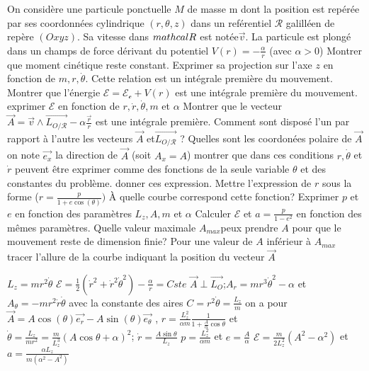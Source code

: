 \begin{Exercise}[title=(*) Vecteur de Runge-Lentz]
  On considère une particule ponctuelle $M$ de masse m dont la position est
  repérée par ses coordonnées cylindrique $(r,\theta,z)$ dans un reférentiel
  $\mathcal{R}$  galilléen de repère $(Oxyz)$. Sa vitesse dans $\\mathcal{R}$
  est notée$\vec{v}$. La particule est plongé dans un champs de force dérivant
  du potentiel $V(r)=-\frac{\alpha}{r}$ (avec $\alpha>0$)
  \Question Montrer que moment cinétique reste constant. Exprimer sa projection
  sur l'axe $z$ en fonction de $m,r,\dot{\theta}$. Cette relation est un intégrale
  première du mouvement.
  \Question Montrer que l'énergie $\mathcal{E}=\mathcal{E_c}+V(r)$ est une
  intégrale première du mouvement. exprimer $\mathcal{E}$ en fonction de
  $r,\dot{r},\dot{\theta},m$ et $\alpha$
  \Question
  \subQuestion Montrer que le vecteur $\vec{A}=\vec{v}\wedge
  \vec{L_{O/\mathcal{R}}}-\alpha \frac{\vec{r}}{r}$ est une intégrale première.
  Comment sont disposé l'un par rapport à l'autre les vecteurs $\vec{A}$
  et$\vec{L_{O/\mathcal{R}}}$ ? Quelles sont les coordonées polaire de $\vec{A}$
  on note $\vec{e_x}$ la direction de $\vec{A}$ (soit $A_x=A$) montrer que dans
  ces conditions $r,\dot{\theta}$ et $\dot{r}$  peuvent être exprimer comme des
  fonctions de la seule variable $\theta$ et des constantes du problème. donner ces
  expression.
  \subQuestion Mettre l'expression de $r$ sous la forme
  ($r=\frac{p}{1+e\cos(\theta)})$  À quelle courbe correspond cette fonction?
  Exprimer $p$ et $e$ en fonction des paramètres $L_z,A,m$ et $\alpha$
  \subQuestion Calculer $\mathcal{E}$ et $a=\frac{p}{1-e^2}$ en fonction des
  mêmes paramètres. Quelle valeur maximale $A_{max}$peux prendre $A$ pour que le
  mouvement reste de dimension finie? Pour une valeur de $A$ inférieur à
  $A_{max}$ tracer l'allure de la courbe indiquant la position du vecteur
  $\vec{A}$

\end{Exercise}
\begin{Answer}
  \Question $L_z=mr^2\dot{\theta}$
  \Question
  $\mathcal{E}=\frac{1}{2}(\dot{r}^2+\dot{r}^2\dot{\theta}^2)-\frac{\alpha}{r}=Cste$
  \Question
  \subQuestion $\vec{A}\perp \vec{L_O}$;$A_r=mr^3\dot{\theta}^2-\alpha$ et
  $A_\theta=-mr^2\dot{r}\dot{\theta}$ avec la constante des aires
  $C=r^2\dot{\theta}=\frac{L_z}{m}$ on a pour
  $\vec{A}=A\cos(\theta)\vec{e_r}-A\sin(\theta)\vec{e_\theta}$ , $r=\frac{L_z^2}{\alpha
    m}\frac{1}{1+\frac{A}{\alpha}\cos\theta}$ et
  $\dot{\theta}=\frac{L_z}{mr^2}=\frac{m}{L_z^3}(A\cos\theta+\alpha)^2$;
  $\dot{r}=\frac{A\sin\theta}{L_z}$
  \subQuestion $p=\frac{L_z^2}{\alpha m}$ et $e=\frac{A}{\alpha}$
  \subQuestion $\mathcal{E}=\frac{m}{2L_z^2}(A^2-\alpha^2)$ et $a=\frac{\alpha
    L_z}{m(\alpha^2-A^2)}$
\end{Answer}
